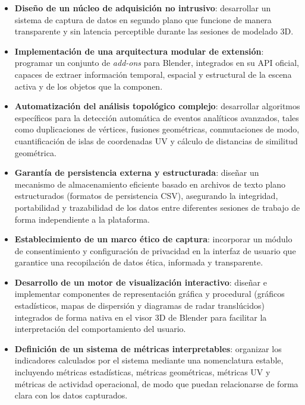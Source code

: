 \begin{itemize}

\item \textbf{Diseño de un núcleo de adquisición no intrusivo}: desarrollar un sistema de captura de datos en segundo plano que funcione de manera transparente y sin latencia perceptible durante las sesiones de modelado 3D.

\item \textbf{Implementación de una arquitectura modular de extensión}: programar un conjunto de \textit{add-ons} para Blender, integrados en su API oficial, capaces de extraer información temporal, espacial y estructural de la escena activa y de los objetos que la componen.

\item \textbf{Automatización del análisis topológico complejo}: desarrollar algoritmos específicos para la detección automática de eventos analíticos avanzados, tales como duplicaciones de vértices, fusiones geométricas, conmutaciones de modo, cuantificación de islas de coordenadas UV y cálculo de distancias de similitud geométrica.

\item \textbf{Garantía de persistencia externa y estructurada}: diseñar un mecanismo de almacenamiento eficiente basado en archivos de texto plano estructurados (formatos de persistencia CSV), asegurando la integridad, portabilidad y trazabilidad de los datos entre diferentes sesiones de trabajo de forma independiente a la plataforma.

\item \textbf{Establecimiento de un marco ético de captura}: incorporar un módulo de consentimiento y configuración de privacidad en la interfaz de usuario que garantice una recopilación de datos ética, informada y transparente.

\item \textbf{Desarrollo de un motor de visualización interactivo}: diseñar e implementar componentes de representación gráfica y procedural (gráficos estadísticos, mapas de dispersión y diagramas de radar translúcidos) integrados de forma nativa en el visor 3D de Blender para facilitar la interpretación del comportamiento del usuario.

\item \textbf{Definición de un sistema de métricas interpretables}: organizar los indicadores calculados por el sistema mediante una nomenclatura estable, incluyendo métricas estadísticas, métricas geométricas, métricas UV y métricas de actividad operacional, de modo que puedan relacionarse de forma clara con los datos capturados.


\end{itemize}
